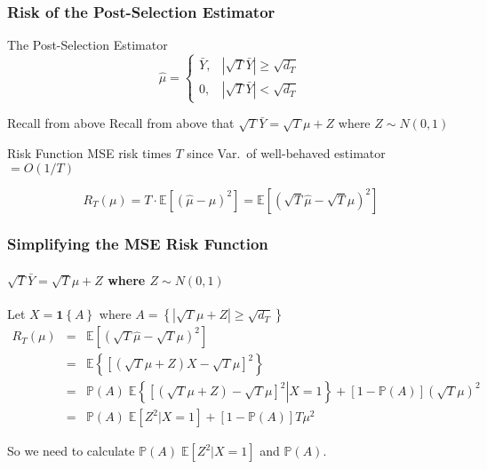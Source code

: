 \begin{frame}
  \frametitle{Risk of the Post-Selection Estimator}
  \begin{block}{The Post-Selection Estimator}
	$$\widehat{\mu}=\left\{\begin{array}
		{cc} \bar{Y}, & |\sqrt{T}\bar{Y} | \geq \sqrt{d_T} \\
		0, & |\sqrt{T}\bar{Y} | < \sqrt{d_T}
		\end{array}\right.$$
  \end{block}

  \vspace{-2em}

  \begin{block}{Recall from above}
Recall from above that $\sqrt{T} \bar{Y} = \sqrt{T}\mu +Z$ where $Z\sim N(0,1)$
  \end{block}
  \begin{block}{Risk Function}
MSE risk times $T$ since Var.\ of well-behaved estimator $ = O(1/T)$

\[
  R_T(\mu) = T \cdot \mathbb{E}\left[\left( \widehat{\mu} - \mu\right)^2\right] = \mathbb{E}\left[\left(\sqrt{T} \widehat{\mu} - \sqrt{T} \mu\right)^2\right] 
\]
  \end{block}
\end{frame}
\begin{frame}
  \frametitle{Simplifying the MSE Risk Function}
  \framesubtitle{$\sqrt{T} \bar{Y} = \sqrt{T}\mu +Z$ where $Z\sim N(0,1)$}

  \footnotesize

  Let $X = \mathbf{1}\left\{ A \right\}$ where $A = \left\{|\sqrt{T}\mu + Z|\geq \sqrt{d_T}  \right\}$
  \begin{eqnarray*}
  R_T(\mu) &=& \mathbb{E}\left[\left(\sqrt{T} \widehat{\mu} - \sqrt{T} \mu\right)^2\right] \\
  &=& \mathbb{E}\left\{ \left[ \left( \sqrt{T}\mu + Z \right)X - \sqrt{T}\mu \right]^2 \right\}\\
  &=& \mathbb{P}(A)\; \mathbb{E}\left\{ \left.\left[ \left(\sqrt{T}\mu + Z\right) - \sqrt{T}\mu\right]^2\right| X = 1 \right\} + \left[ 1 - \mathbb{P}(A) \right]\left( \sqrt{T}\mu \right)^2\\
  &=& \mathbb{P}(A)\; \mathbb{E}
  \left[ Z^2 |X = 1 \right] + \left[ 1 - \mathbb{P}(A) \right]T\mu^2
\end{eqnarray*}

\alert{So we need to calculate $\mathbb{P}(A)\; \mathbb{E}[Z^2|X=1]$ and $\mathbb{P}(A)$.}
\end{frame}
